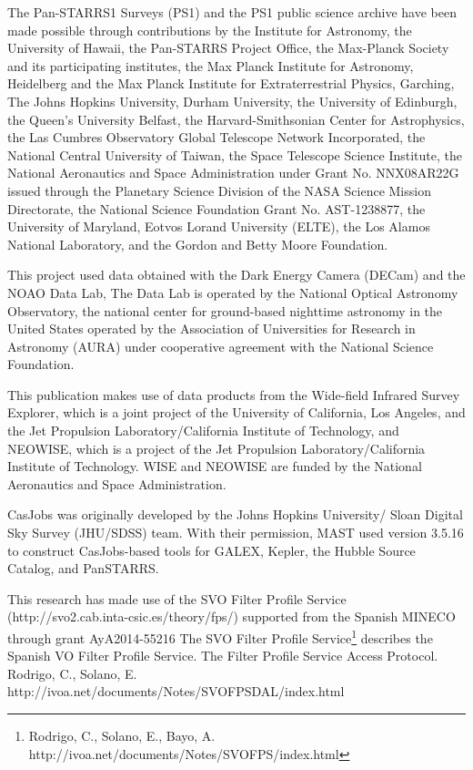 \documentclass[usenatbib]{mnras}
\begin{document}
The Pan-STARRS1 Surveys (PS1) and the PS1 public science archive have
been made possible through contributions by the Institute for
Astronomy, the University of Hawaii, the Pan-STARRS Project Office,
the Max-Planck Society and its participating institutes, the Max
Planck Institute for Astronomy, Heidelberg and the Max Planck
Institute for Extraterrestrial Physics, Garching, The Johns Hopkins
University, Durham University, the University of Edinburgh, the
Queen's University Belfast, the Harvard-Smithsonian Center for
Astrophysics, the Las Cumbres Observatory Global Telescope Network
Incorporated, the National Central University of Taiwan, the Space
Telescope Science Institute, the National Aeronautics and Space
Administration under Grant No. NNX08AR22G issued through the Planetary
Science Division of the NASA Science Mission Directorate, the National
Science Foundation Grant No. AST-1238877, the University of Maryland,
Eotvos Lorand University (ELTE), the Los Alamos National Laboratory,
and the Gordon and Betty Moore Foundation.

This project used data obtained with the Dark Energy Camera (DECam)
and the NOAO Data Lab, The Data Lab is operated by the National
Optical Astronomy Observatory, the national center for ground-based
nighttime astronomy in the United States operated by the Association
of Universities for Research in Astronomy (AURA) under cooperative
agreement with the National Science Foundation.

This publication makes use of data products from the Wide-field
Infrared Survey Explorer, which is a joint project of the University
of California, Los Angeles, and the Jet Propulsion
Laboratory/California Institute of Technology, and NEOWISE, which is a
project of the Jet Propulsion Laboratory/California Institute of
Technology. WISE and NEOWISE are funded by the National Aeronautics
and Space Administration.

CasJobs was originally developed by the Johns Hopkins University/
Sloan Digital Sky Survey (JHU/SDSS) team. With their permission, MAST
used version 3.5.16 to construct CasJobs-based tools for GALEX,
Kepler, the Hubble Source Catalog, and PanSTARRS.

This research has made use of the SVO Filter Profile Service
(http://svo2.cab.inta-csic.es/theory/fps/) supported from the Spanish
MINECO through grant AyA2014-55216 
The SVO Filter Profile Service\footnote{Rodrigo, C., Solano, E., Bayo, A. http://ivoa.net/documents/Notes/SVOFPS/index.html}
describes the Spanish VO Filter Profile Service. 
The Filter Profile Service Access Protocol. Rodrigo, C., Solano, E. http://ivoa.net/documents/Notes/SVOFPSDAL/index.html
\end{document}
